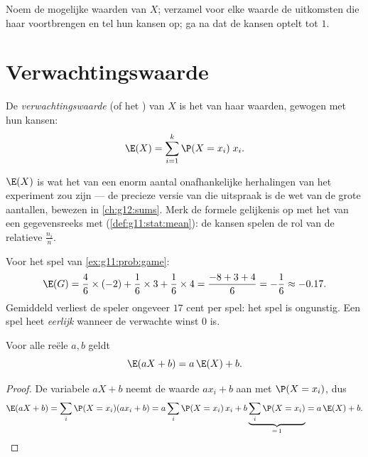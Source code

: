 \begin{method}\label{met:g11:prob:table}
Noem de mogelijke waarden van $X$; verzamel voor elke waarde de uitkomsten
die haar voortbrengen en tel hun kansen op; ga na dat de  kansen optelt
tot $1$.
\end{method}

\section{Verwachtingswaarde}

\begin{definition}[Verwachtingswaarde]\label{def:g11:prob:expectation}
De \emph{verwachtingswaarde} (of het )
van $X$ is het  van haar waarden, gewogen met hun kansen:
\[
\E(X) = \sum_{i=1}^{k} \P(X = x_i)\; x_i .
\]
\end{definition}

\begin{remark}
$\E(X)$ is wat het  van een enorm aantal onafhankelijke
herhalingen van het experiment zou zijn --- de precieze versie van die
uitspraak is de wet van de grote aantallen, bewezen in \cref{ch:g12:sums}.
Merk de formele gelijkenis op met het  van een gegevensreeks met
 (\cref{def:g11:stat:mean}): de kansen spelen de rol van de
relatieve  $\frac{n_i}{n}$.
\end{remark}

\begin{example}\label{ex:g11:prob:gameexp}
Voor het spel van \cref{ex:g11:prob:game}:
\[
\E(G) = \frac46 \times (-2) + \frac16 \times 3 + \frac16 \times 4
= \frac{-8 + 3 + 4}{6} = -\frac16 \approx -0.17 .
\]
Gemiddeld verliest de speler ongeveer $17$ cent per spel: het spel is
ongunstig. Een spel heet \emph{eerlijk} wanneer de verwachte winst $0$ is.
\end{example}

\begin{proposition}[Lineariteit]\label{prop:g11:prob:linearity}
Voor alle reële $a, b$ geldt
\[
\E(aX + b) = a\,\E(X) + b .
\]
\end{proposition}

\begin{proof}
De variabele $aX + b$ neemt de waarde $a x_i + b$ aan met 
$\P(X = x_i)$, dus
\[
\E(aX + b) = \sum_i \P(X = x_i)(a x_i + b)
= a \sum_i \P(X = x_i)\,x_i + b \underbrace{\sum_i \P(X =
x_i)}_{=\,1} = a\,\E(X) + b .
\]
\end{proof}

